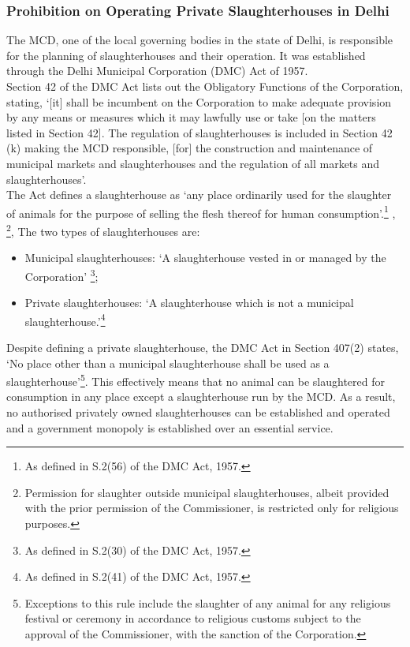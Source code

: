 \documentclass[a4paper, 12pt]{article}
\begin{document}
\subsubsection{Prohibition on Operating Private Slaughterhouses in Delhi}

The MCD, one of the local governing bodies in the state of Delhi, is responsible for the planning of slaughterhouses and their operation. It was established through the Delhi Municipal Corporation (DMC) Act of 1957. \\

Section 42 of the DMC Act lists out the Obligatory Functions of the Corporation, stating, ‘[it] shall be incumbent on the Corporation to make adequate provision by any means or measures which it may lawfully use or take [on the matters listed in Section 42]. The regulation of slaughterhouses is included in Section 42 (k) making the MCD responsible, [for] the construction and maintenance of municipal markets and slaughterhouses and the regulation of all markets and slaughterhouses’.\\

The Act defines a slaughterhouse as ‘any place ordinarily used for the slaughter of animals for the purpose of selling the flesh thereof for human consumption’.\footnote{ As defined in S.2(56) of the DMC Act, 1957.} ,  \footnote{ Permission for slaughter outside municipal slaughterhouses, albeit provided with the prior permission of the Commissioner, is restricted only for religious purposes.}, The two types of slaughterhouses are:

\begin{itemize}
\item Municipal slaughterhouses: ‘A slaughterhouse vested in or managed by the Corporation’ \footnote{ As defined in S.2(30) of the DMC Act, 1957.};
\item Private slaughterhouses: ‘A slaughterhouse which is not a municipal slaughterhouse.’\footnote{ As defined in S.2(41) of the DMC Act, 1957.}
\end{itemize}

Despite defining a private slaughterhouse, the DMC Act in Section 407(2) states, ‘No place other than a municipal slaughterhouse shall be used as a slaughterhouse’\footnote{ Exceptions to this rule include the slaughter of any animal for any religious festival or ceremony in accordance to religious customs subject to the approval of the Commissioner, with the sanction of the Corporation.}. This effectively means that no animal can be slaughtered for consumption in any place except a slaughterhouse run by the MCD. As a result, no authorised privately owned slaughterhouses can be established and operated and a government monopoly is established over an essential service. \\
\end{document}
